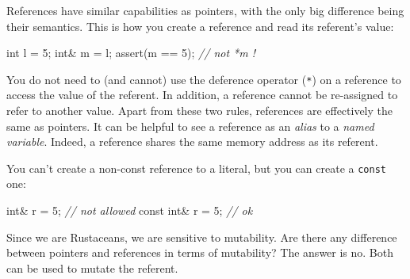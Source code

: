 \documentclass[
]{book}
\newenvironment{Shaded}{\begin{snugshade}}{\end{snugshade}}
\newcommand{\AttributeTok}[1]{\textcolor[rgb]{0.77,0.63,0.00}{#1}}
\newcommand{\CommentTok}[1]{\textcolor[rgb]{0.56,0.35,0.01}{\textit{#1}}}
\newcommand{\DataTypeTok}[1]{\textcolor[rgb]{0.13,0.29,0.53}{#1}}
\newcommand{\DecValTok}[1]{\textcolor[rgb]{0.00,0.00,0.81}{#1}}
\newcommand{\NormalTok}[1]{#1}
\newcommand{\OtherTok}[1]{\textcolor[rgb]{0.56,0.35,0.01}{#1}}
\begin{document}
References have similar capabilities as pointers, with the only big difference being their semantics.
This is how you create a reference and read its referent's value:

\begin{Shaded}
\begin{Highlighting}[]
\DataTypeTok{int}\NormalTok{ l = }\DecValTok{5}\NormalTok{;}
\DataTypeTok{int}\NormalTok{\& m = l;}
\OtherTok{assert}\NormalTok{(m == }\DecValTok{5}\NormalTok{); }\CommentTok{// not \textasciigrave{}*m\textasciigrave{} !}
\end{Highlighting}
\end{Shaded}

You do not need to (and cannot) use the deference operator (\texttt{*}) on a reference to access the value of the referent. In addition, a reference cannot be re-assigned to refer to another value. Apart from these two rules, references are effectively the same as pointers. It can be helpful to see a reference as an \emph{alias} to a \emph{named variable}. Indeed, a reference shares the same memory address as its referent.

You can't create a non-const reference to a literal, but you can create a \texttt{const} one:

\begin{Shaded}
\begin{Highlighting}[]
\DataTypeTok{int}\NormalTok{\& r = }\DecValTok{5}\NormalTok{; }\CommentTok{// not allowed}
\AttributeTok{const} \DataTypeTok{int}\NormalTok{\& r = }\DecValTok{5}\NormalTok{; }\CommentTok{// ok}
\end{Highlighting}
\end{Shaded}

Since we are Rustaceans, we are sensitive to mutability. Are there any difference between pointers and references in terms of mutability? The answer is no. Both can be used to mutate the referent.
\end{document}
